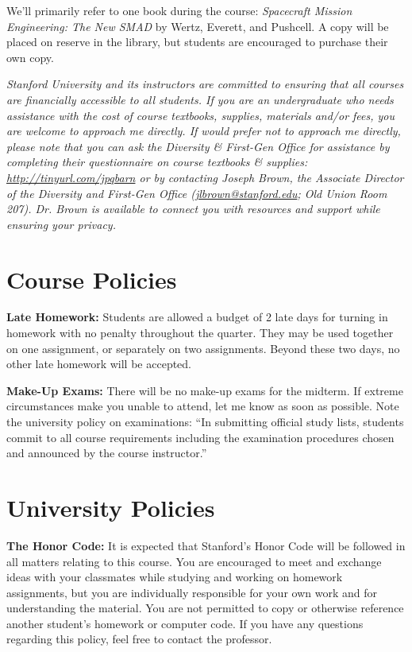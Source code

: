 \documentclass[11pt,letterpaper]{article}
\begin{document}
We'll primarily refer to one book during the course: \textit{Spacecraft Mission Engineering: The New SMAD} by Wertz, Everett, and Pushcell. A copy will be placed on reserve in the library, but students are encouraged to purchase their own copy.

\medskip
\noindent
\emph{Stanford University and its instructors are committed to ensuring that all courses are financially accessible to all students. If you are an undergraduate who needs assistance with the cost of course textbooks, supplies, materials and/or fees, you are welcome to approach me directly. If would prefer not to approach me directly, please note that you can ask the Diversity \& First-Gen Office for assistance by completing their questionnaire on course textbooks \& supplies: \href{http://tinyurl.com/jpqbarn}{http://tinyurl.com/jpqbarn} or by contacting Joseph Brown, the Associate Director of the Diversity and First-Gen Office (\href{mailto:jlbrown@stanford.edu}{jlbrown@stanford.edu}; Old Union Room 207). Dr. Brown is available to connect you with resources and support while ensuring your privacy.}

\section*{Course Policies}

\textbf{Late Homework:} Students are allowed a budget of 2 late days for turning in homework with no penalty throughout the quarter. They may be used together on one assignment, or separately on two assignments. Beyond these two days, no other late homework will be accepted.

\medskip
\noindent
\textbf{Make-Up Exams:} There will be no make-up exams for the midterm. If extreme circumstances make you unable to attend, let me know as soon as possible. Note the university policy on examinations: ``In submitting official study lists, students commit to all course requirements including the examination procedures chosen and announced by the course instructor.''

\section*{University Policies}

\textbf{The Honor Code:} It is expected that Stanford's Honor Code will be followed in all matters relating to this course. You are encouraged to meet and exchange ideas with your classmates while studying and working on homework assignments, but you are individually responsible for your own work and for understanding the material. You are not permitted to copy or otherwise reference another student's homework or computer code. If you have any questions regarding this policy, feel free to contact the professor.
\end{document}
